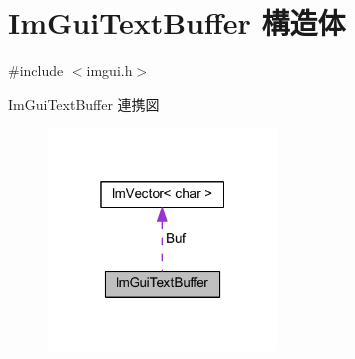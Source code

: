 \hypertarget{struct_im_gui_text_buffer}{}\section{Im\+Gui\+Text\+Buffer 構造体}
\label{struct_im_gui_text_buffer}


{\ttfamily \#include $<$imgui.\+h$>$}



Im\+Gui\+Text\+Buffer 連携図\nopagebreak
\begin{figure}[H]
\begin{center}
\leavevmode
\includegraphics[width=172pt]{struct_im_gui_text_buffer__coll__graph}
\end{center}
\end{figure}
